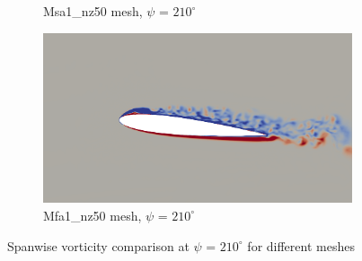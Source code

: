 \begin{figure}[H]
\begin{subfigure}[b]{0.475\textwidth}
\caption{Msa1\_nz50 mesh, $\psi$ = $210^\circ$}
\label{fig:hadapt_psi210}
\end{subfigure}
\begin{subfigure}[b]{0.475\textwidth}
\centering
\includegraphics[width=1\textwidth]{figures/adapt_strat/vorticity_plots/Mfa1_50/phase_210.png}
\caption{Mfa1\_nz50 mesh, $\psi$ = $210^\circ$}
\label{fig:FB_psi210}
\end{subfigure}
\caption{Spanwise vorticity comparison at $\psi$ = $210^\circ$ for different meshes}
\label{fig:vorticity_210}
\end{figure}



